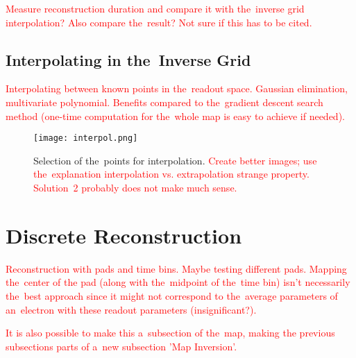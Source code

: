 			\textcolor{red}{Measure reconstruction duration and compare it with the~inverse grid interpolation? Also compare the~result? Not sure if this has to be cited.}
		
		\subsection{Interpolating in the~Inverse Grid}
			\textcolor{red}{Interpolating between known points in the~readout space. Gaussian elimination, multivariate polynomial. Benefits compared to the~gradient descent search method (one-time computation for the~whole map is easy to achieve if needed).}
			
			\begin{figure}
				\centering
				\texttt{[image: interpol.png]}
				\caption{Selection of the~points for interpolation. \textcolor{red}{Create better images; use the~explanation interpolation vs. extrapolation strange property. Solution~2 probably does not make much sense.}}
				\label{fig:interpol}
			\end{figure}
		
	\section{Discrete Reconstruction}
		\textcolor{red}{Reconstruction with pads and time bins. Maybe testing different pads. Mapping the~center of the pad (along with the~midpoint of the~time bin) isn't necessarily the~best approach since it might not correspond to the~average parameters of an~electron with these readout parameters (insignificant?).}
		
		\textcolor{red}{It is also possible to make this a~subsection of the~map, making the previous subsections parts of a~new subsection 'Map Inversion'.}